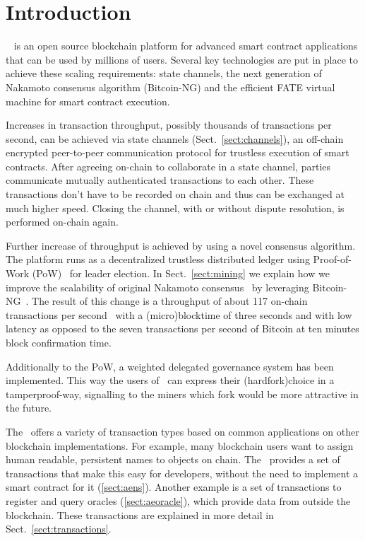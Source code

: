 \section{Introduction}

\Aet\ \cite{AE,UlfWigerCodeMesh2018} is an open source blockchain
platform for advanced smart contract applications
that can be used by millions of users. Several key technologies
are put in place to achieve these scaling requirements: state channels, the
next generation of Nakamoto consensus algorithm (Bitcoin-NG) and the
efficient FATE virtual machine for smart contract execution.

Increases in transaction throughput, possibly thousands of
transactions per second, can be achieved via state channels (Sect.\
\ref{sect:channels}),
an off-chain encrypted peer-to-peer communication protocol for trustless
execution of smart contracts. After
agreeing on-chain to collaborate in a state channel, parties communicate
mutually authenticated transactions to each other. These transactions don't
have to be recorded on chain and thus can be exchanged at much higher
speed. Closing the channel, with or without dispute resolution, is performed
on-chain again.

Further increase of throughput is achieved by using a novel consensus
algorithm.
The platform runs as a decentralized trustless distributed ledger using
Proof-of-Work (PoW)~\cite{dwork1992pricing,back1997hashcash,Tromp2015CuckooCA}
for leader election.
In Sect.~\ref{sect:mining} we explain how we improve the scalability of
original Nakamoto consensus~\cite{SN} by leveraging
Bitcoin-NG~\cite{Eyal:2016:BSB:2930611.2930615}. The result of this change
is a throughput of about 117 on-chain transactions per
second~\cite{source?} with a (micro)blocktime of three seconds and with
low latency as opposed to the seven transactions per second of Bitcoin at ten
minutes block confirmation time.

Additionally to the PoW, a weighted delegated governance system has been
implemented. This way the users of \blockchain\ can express their
(hardfork)choice in a tamperproof-way, signalling to the miners which fork
would be more attractive in the future.

The \blockchain\ offers a variety of transaction types
based on common applications on other blockchain implementations.
For example, many blockchain users want to assign human readable, persistent
names to objects on chain. The \blockchain\ provides a
set of transactions that make this easy for developers, without the need to
implement a smart contract for it (\ref{sect:aens}). Another example is a set
of transactions to register and query oracles (\ref{sect:aeoracle}), which
provide data from outside the blockchain.
These transactions are explained in more detail in
Sect.~\ref{sect:transactions}.

